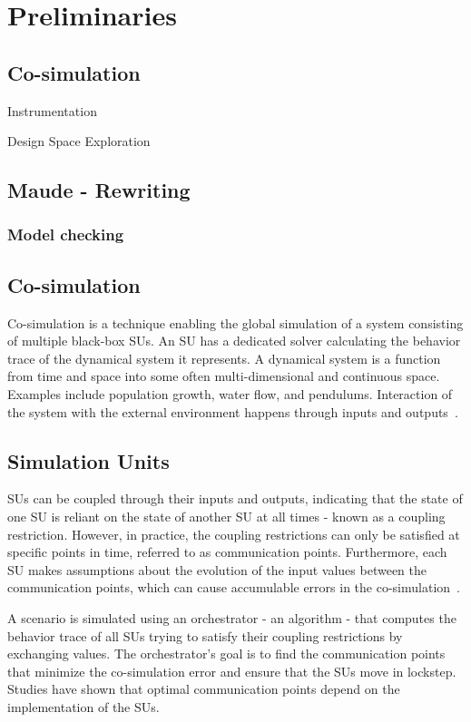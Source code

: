 \section{Preliminaries}\label{sc:background}
\subsection{Co-simulation}

Instrumentation

Design Space Exploration
\subsection{Maude - Rewriting}
\subsubsection{Model checking}


\subsection{Co-simulation}
Co-simulation is a technique enabling the global simulation of a system consisting of multiple black-box SUs. 
An SU has a dedicated solver calculating the behavior trace of the dynamical system it represents. 
A dynamical system is a function from time and space into some often multi-dimensional and continuous space. Examples include population growth, water flow, and pendulums. 
Interaction of the system with the external environment happens through inputs and outputs~\cite{Gomes2019a,Kubler2000}.

\subsection{Simulation Units}
SUs can be coupled through their inputs and outputs, indicating that the state of one SU is reliant on the state of another SU at all times - known as a coupling restriction. However, in practice, the coupling restrictions can only be satisfied at specific points in time, referred to as communication points. Furthermore, each SU makes assumptions about the evolution of the input values between the communication points, which can cause accumulable errors in the co-simulation~\cite{Arnold2014}. 

A scenario is simulated using an orchestrator - an algorithm - that computes the behavior trace of all SUs trying to satisfy their coupling restrictions by exchanging values. 
The orchestrator's goal is to find the communication points that minimize the co-simulation error and ensure that the SUs move in lockstep. 
Studies \cite{Gomes2019,Oakes2021,Gomes2018f,Schweizer2015c,Gomes2018a} have shown that optimal communication points depend on the implementation of the SUs.

